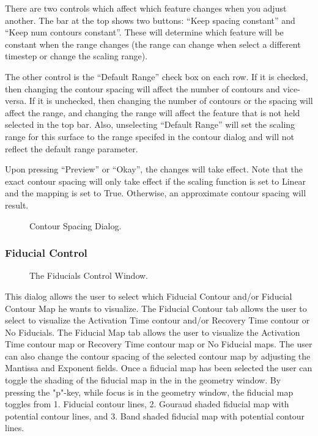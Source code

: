 There are two controls which affect which feature changes when you adjust
another.  The bar at the top shows two buttons: ``Keep spacing constant''
and ``Keep num contours constant''.  These will determine which feature will
be constant when the range changes (the range can change when select a 
different timestep or change the scaling range).  

The other control is the ``Default Range''
check box on each row.  If it is checked, then changing the contour spacing
will affect the number of contours and vice-versa.  If it is unchecked, then
changing the number of contours or the spacing will affect the range, and
changing the range will affect the feature that is not held selected in the
top bar.  Also, unselecting ``Default Range'' will set the scaling range
for this surface to the range specifed in the contour dialog and will not
reflect the default range parameter.

Upon pressing ``Preview'' or ``Okay'', the changes will take effect.  Note that
the exact contour spacing will only take effect if the scaling function is 
set to Linear and the mapping is set to True.  Otherwise, an approximate 
contour spacing will result.  

\begin{figure}[htb]
  \begin{makeimage}
  \end{makeimage}
  \contourdialog
  \caption{\label{fig:contourdialog} Contour Spacing Dialog.}
\end{figure}


\subsubsection{Fiducial Control}
\label{sec:fiducialswindow}

\begin{figure}[htb]
  \begin{makeimage}
  \end{makeimage}
  \fiducialswindow
  \caption{\label{fig:fid1} The Fiducials Control Window.}
\end{figure}
This dialog allows the user to select which Fiducial Contour and/or
Fiducial Contour Map he wants to visualize.  The Fiducial
Contour tab allows the user to select to visualize the Activation Time
contour and/or Recovery Time contour or No Fiducials.  The Fiducial
Map tab allows the user to visualize the Activation Time contour
map or Recovery Time contour map or No Fiducial maps.  The user can
also change the contour spacing of the selected contour map by adjusting 
the Mantissa and Exponent fields.  Once a fiducial map has been selected
the user can toggle the shading of the fiducial map in the in the geometry window.
By pressing the "p"-key, while focus is in the geometry window, the fiducial map toggles from 
1. Fiducial contour lines, 2. Gouraud shaded fiducial map with potential
contour lines, and 3. Band shaded fiducial map with potential contour lines.
